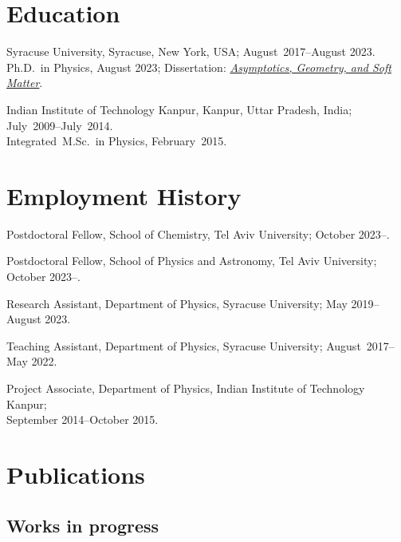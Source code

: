 \documentclass[10pt,a4paper,article,oneside]{memoir}
\begin{document}

\section{Education}

Syracuse University, Syracuse, New York, USA; August~2017--August 2023.\\
Ph.D.~in Physics, August 2023; Dissertation: \emph{\href{https://raw.githubusercontent.com/manu-mannattil/thesis/build/thesis.pdf}{Asymptotics, Geometry, and Soft Matter}}.

Indian Institute of Technology Kanpur, Kanpur, Uttar Pradesh, India; July~2009--July~2014.\\
Integrated~M.Sc.~in Physics, February~2015.




\section{Employment History}

Postdoctoral Fellow, School of Chemistry, Tel Aviv University; October 2023--.

Postdoctoral Fellow, School of Physics and Astronomy, Tel Aviv University; October 2023--.

Research Assistant, Department of Physics, Syracuse University; May 2019--August 2023.

Teaching Assistant, Department of Physics, Syracuse University; August~2017--May 2022.

Project Associate, Department of Physics, Indian Institute of Technology Kanpur;\\ September 2014--October 2015.


\section{Publications}

\subsection{Works in progress}
\end{document}
